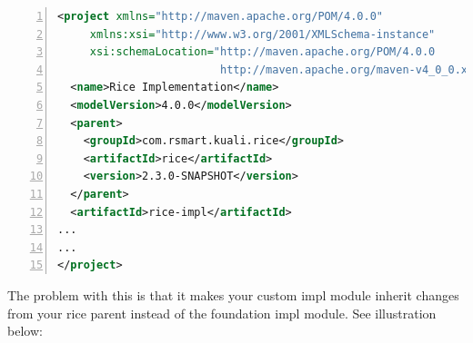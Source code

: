 \documentclass[12pt,notitlepage]{article}
\begin{document}
\begin{lstlisting}[numbers=left,language=xml,basicstyle=\scriptsize,backgroundcolor=\color{ubergray},caption={Custom Impl Module Parent Definition},frame=single,breaklines=true]
<project xmlns="http://maven.apache.org/POM/4.0.0" 
     xmlns:xsi="http://www.w3.org/2001/XMLSchema-instance" 
     xsi:schemaLocation="http://maven.apache.org/POM/4.0.0 
                         http://maven.apache.org/maven-v4_0_0.xsd">
  <name>Rice Implementation</name>
  <modelVersion>4.0.0</modelVersion>
  <parent>
    <groupId>com.rsmart.kuali.rice</groupId>
    <artifactId>rice</artifactId>
    <version>2.3.0-SNAPSHOT</version>
  </parent>
  <artifactId>rice-impl</artifactId>
...
...
</project>
  \end{lstlisting}

The problem with this is that it makes your custom impl module inherit changes from your rice parent instead of the foundation impl module. See illustration below:

\lstlistoflistings
\end{document}
